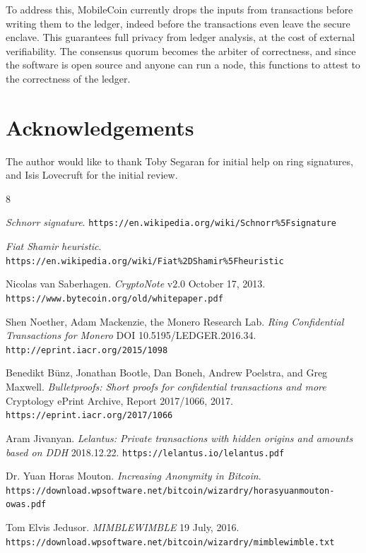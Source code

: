 \documentclass{article}
\begin{document}
To address this, MobileCoin currently drops the inputs from transactions before writing them to the ledger, indeed before the transactions even leave the secure enclave.  This guarantees full privacy from ledger analysis, at the cost of external verifiability.  The consensus quorum becomes the arbiter of correctness, and since the software is open source and anyone can run a node, this functions to attest to the correctness of the ledger.



\section{Acknowledgements}

The author would like to thank Toby Segaran for initial help on ring signatures, and Isis Lovecruft for the initial review.


\begin{thebibliography}{8}

  \emph{Schnorr signature}.
  \texttt{https://en.wikipedia.org/wiki/Schnorr\%5Fsignature}

  \emph{Fiat Shamir heuristic}.
  \texttt{https://en.wikipedia.org/wiki/Fiat\%2DShamir\%5Fheuristic}

  Nicolas van Saberhagen.
  \emph{CryptoNote} v$2.0$ October 17, 2013.
  \texttt{https://www.bytecoin.org/old/whitepaper.pdf}

  Shen Noether, Adam Mackenzie, the Monero Research Lab.
  \emph{Ring Confidential Transactions for Monero} DOI 10.5195/LEDGER.2016.34.
  \texttt{http://eprint.iacr.org/2015/1098}

  Benedikt Bünz, Jonathan Bootle, Dan Boneh, Andrew Poelstra, and Greg Maxwell.
  \emph{Bulletproofs: Short proofs for confidential transactions and more} Cryptology ePrint Archive, Report 2017/1066, 2017.
  \texttt{https://eprint.iacr.org/2017/1066}

  Aram Jivanyan.
  \emph{Lelantus: Private transactions with hidden origins and amounts based on DDH} 2018.12.22.
  \texttt{https://lelantus.io/lelantus.pdf}

  Dr. Yuan Horas Mouton.
  \emph{Increasing Anonymity in Bitcoin}.\\
  \texttt{https://download.wpsoftware.net/bitcoin/wizardry/horasyuanmouton-owas.pdf}

  Tom Elvis Jedusor.
  \emph{MIMBLEWIMBLE} 19 July, 2016.\\
  \texttt{https://download.wpsoftware.net/bitcoin/wizardry/mimblewimble.txt}

\end{thebibliography}
\end{document}
